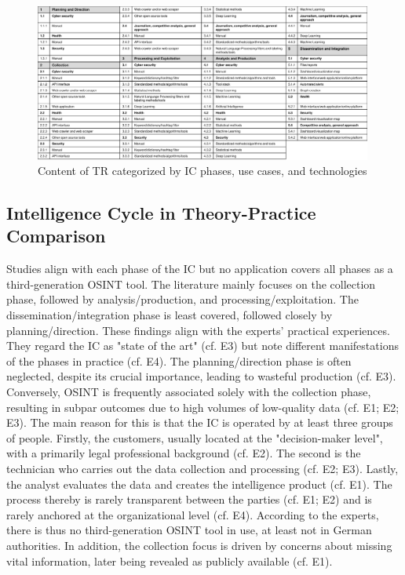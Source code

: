 \documentclass[10pt]{article}
\begin{document}
\begin{figure}[thb]
    \centering
    \includegraphics[width=0.99\textwidth]{PDF/images/crop_Trendradar explanation}
    \caption{Content of TR categorized by IC phases, use cases, and technologies}
    \label{fig:trendradarexplanation}
\end{figure}

\subsection{Intelligence Cycle in Theory-Practice Comparison} \label{sec:intcomp}

Studies align with each phase of the IC but no application covers all phases as a third-generation OSINT tool. The literature mainly focuses on the collection phase, followed by analysis/production, and processing/exploitation. The dissemination/integration phase is least covered, followed closely by planning/direction.
These findings align with the experts' practical experiences. They regard the IC as "state of the art" (cf. E3) but note different manifestations of the phases in practice (cf. E4).
The planning/direction phase is often neglected, despite its crucial importance, leading to wasteful production (cf. E3). Conversely, OSINT is frequently associated solely with the collection phase,
resulting in subpar outcomes due to high volumes of low-quality data (cf. E1; E2; E3). The main reason for this is that the IC is operated by at least three groups of people. Firstly, the customers, usually located at the "decision-maker level", with a primarily legal professional background (cf. E2).
The second is the technician who carries out the data collection and processing (cf. E2; E3). Lastly, the analyst evaluates the data and creates the intelligence product (cf. E1). The process thereby is rarely transparent between the parties
(cf. E1; E2) and is rarely anchored at the organizational level (cf. E4). According to the experts, there is thus no third-generation
OSINT tool in use, at least not in German authorities. In addition, the collection focus is driven by concerns about missing vital information, later being revealed as publicly available (cf. E1).
\end{document}
